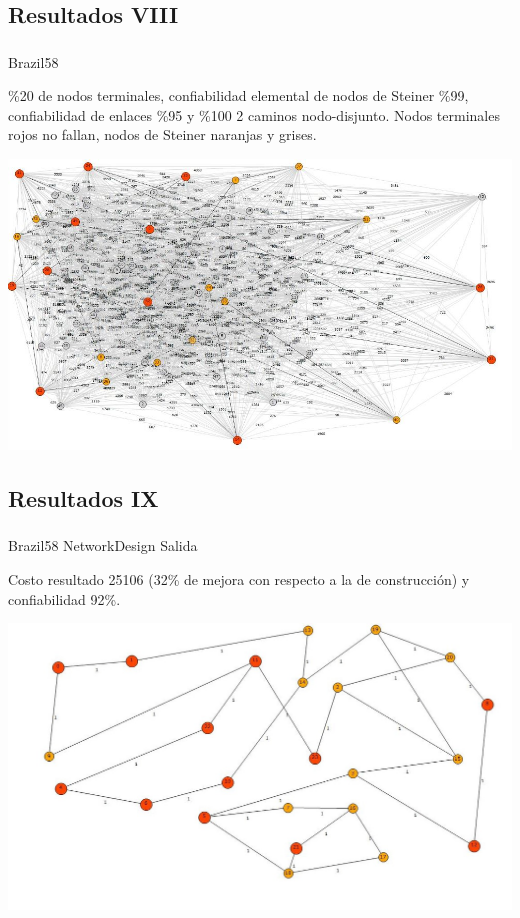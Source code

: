 \subsection{Resultados VIII}
\begin{frame}\frametitle{}
\begin{block}{Brazil58}
\begin{scriptsize}
\%20 de nodos terminales, confiabilidad elemental de nodos de Steiner \%99, confiabilidad de enlaces \%95 y \%100 2 caminos nodo-disjunto. Nodos terminales rojos no fallan, nodos de Steiner naranjas y grises.
\end{scriptsize}
\begin{center}
   \includegraphics[scale=0.35]{figuras/1}
\end{center}
\end{block}
\end{frame}

\subsection{Resultados IX}
\begin{frame}\frametitle{}
\begin{block}{Brazil58 NetworkDesign Salida}
\begin{scriptsize}
Costo resultado 25106 (32\% de mejora con respecto a la de construcción) y confiabilidad 92\%. 
\end{scriptsize}
\begin{center}
   \includegraphics[scale=0.35]{figuras/2}
\end{center}
\end{block}
\end{frame}

